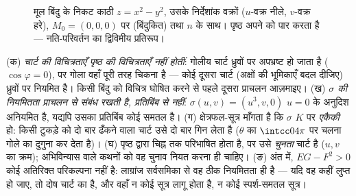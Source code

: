 \begin{figure}[ht]
\centering
{}
\caption{मूल बिंदु के निकट काठी $z = x^2 - y^2$, उसके निर्देशांक वक्रों
($u$-वक्र नीले, $v$-वक्र हरे), $M_0 = (0,0,0)$ पर  (बिंदुकित)
तथा  $n$ के साथ। पृष्ठ अपने  को पार करता
है --- नति-परिवर्तन का द्विविमीय प्रतिरूप।}
\label{fig:b2:surfaces:saddle}
\end{figure}

\begin{remark}[सामान्य चूकें]
(क) \emph{चार्ट की विचित्रताएँ पृष्ठ की विचित्रताएँ नहीं होतीं}:
गोलीय चार्ट ध्रुवों पर अपभ्रष्ट हो जाता है ($\cos\varphi = 0$), पर गोला वहाँ
पूरी तरह चिकना है --- कोई दूसरा चार्ट (अक्षों की भूमिकाएँ बदल दीजिए)
ध्रुवों पर नियमित है। किसी बिंदु को विचित्र घोषित करने से पहले दूसरा
प्राचलन आज़माइए। (ख) \emph{$\sigma$ की नियमितता प्राचलन से संबंध रखती
है, प्रतिबिंब से नहीं}: $\sigma(u, v) = (u^3, v,
0)$ $u = 0$ के अनुदिश अनियमित है, यद्यपि
उसका प्रतिबिंब कोई समतल है। (ग) क्षेत्रफल-सूत्र माँगता है कि $\sigma$
$K$ पर \emph{एकैकी} हो: किसी टुकड़े को दो बार ढँकने वाला चार्ट
उसे दो बार गिन लेता है ($\theta$ का $\intcc0{4\pi}$ पर चलना गोले का 
दुगुना कर देता है)। (घ)  पृष्ठ द्वारा चिह्न तक परिभाषित
होता है, पर उसे \emph{चुनता} चार्ट है ($u, v$ का क्रम); अभिविन्यास
वाले कथनों को वह चुनाव नियत करना ही चाहिए। (ङ) अंत में, $EG - F^2 > 0$ कोई
अतिरिक्त परिकल्पना नहीं है: लाग्रांज सर्वसमिका से वह ठीक नियमितता
ही है --- यदि वह कहीं लुप्त हो जाए, तो दोष चार्ट का है, और वहाँ न
कोई  सूत्र लागू होता है, न कोई स्पर्श-समतल सूत्र।
\end{remark}

